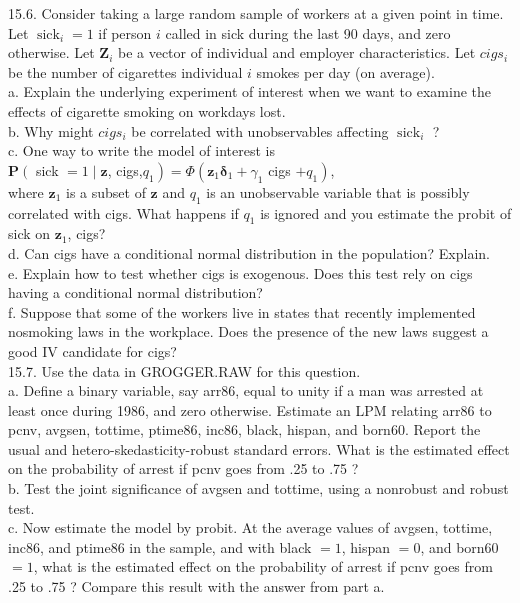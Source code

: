 \documentclass[10pt]{article}
\begin{document}
15.6. Consider taking a large random sample of workers at a given point in time. Let $\operatorname{sick}_{i}=1$ if person $i$ called in sick during the last 90 days, and zero otherwise. Let $\mathbf{Z}_{i}$ be a vector of individual and employer characteristics. Let $c i g s_{i}$ be the number of cigarettes individual $i$ smokes per day (on average).\\
a. Explain the underlying experiment of interest when we want to examine the effects of cigarette smoking on workdays lost.\\
b. Why might $c i g s_{i}$ be correlated with unobservables affecting $\operatorname{sick}_{i}$ ?\\
c. One way to write the model of interest is\\
$\mathbf{P}\left(\right.$ sick $=1 \mid \mathbf{z}$, cigs,$\left.q_{1}\right)=\Phi\left(\mathbf{z}_{1} \boldsymbol{\delta}_{1}+\gamma_{1}\right.$ cigs $\left.+q_{1}\right)$,\\
where $\mathbf{z}_{1}$ is a subset of $\mathbf{z}$ and $q_{1}$ is an unobservable variable that is possibly correlated with cigs. What happens if $q_{1}$ is ignored and you estimate the probit of sick on $\mathbf{z}_{1}$, cigs?\\
d. Can cigs have a conditional normal distribution in the population? Explain.\\
e. Explain how to test whether cigs is exogenous. Does this test rely on cigs having a conditional normal distribution?\\
f. Suppose that some of the workers live in states that recently implemented nosmoking laws in the workplace. Does the presence of the new laws suggest a good IV candidate for cigs?\\
15.7. Use the data in GROGGER.RAW for this question.\\
a. Define a binary variable, say arr86, equal to unity if a man was arrested at least once during 1986, and zero otherwise. Estimate an LPM relating arr86 to pcnv, avgsen, tottime, ptime86, inc86, black, hispan, and born60. Report the usual and hetero-skedasticity-robust standard errors. What is the estimated effect on the probability of arrest if pcnv goes from .25 to .75 ?\\
b. Test the joint significance of avgsen and tottime, using a nonrobust and robust test.\\
c. Now estimate the model by probit. At the average values of avgsen, tottime, inc86, and ptime86 in the sample, and with black $=1$, hispan $=0$, and born60 $=1$, what is the estimated effect on the probability of arrest if pcnv goes from .25 to .75 ? Compare this result with the answer from part a.\\
\end{document}
